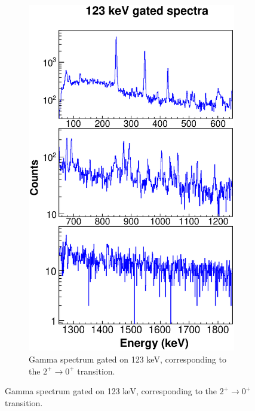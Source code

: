     \begin{figure}
    \ContinuedFloat
    \begin{subfigure}{\textwidth}
    \includegraphics[scale=0.8]{154GdTablesAndFigs/123_gamma.eps}
    \caption{Gamma spectrum gated on 123 keV, corresponding to the $2^+\rightarrow0^+$ transition.}
    \label{fig:154_2to0spec}
    \end{subfigure}
\end{figure}